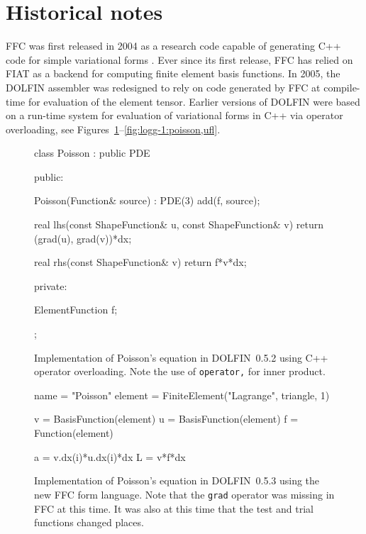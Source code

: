 \section{Historical notes}

FFC was first released in 2004 as a research code capable of
generating C++ code for simple variational forms
\citep{KirbyLogg2006,KirbyLogg2007}. Ever since its first release,
FFC has relied on FIAT as a backend for computing finite element basis
functions. In 2005, the DOLFIN assembler was redesigned to rely on
code generated by FFC at compile-time for evaluation of the element
tensor. Earlier versions of DOLFIN were based on a run-time system for
evaluation of variational forms in C++ via operator overloading, see
Figures~\ref{fig:logg-1:poisson,before}--\ref{fig:logg-1:poisson,ufl}.

\begin{figure}
  \begin{center}
\begin{c++}
class Poisson : public PDE
{
public:

  Poisson(Function& source) : PDE(3)
  {
    add(f, source);
  }

  real lhs(const ShapeFunction& u,
           const ShapeFunction& v)
  {
    return (grad(u), grad(v))*dx;
  }

  real rhs(const ShapeFunction& v)
  {
    return f*v*dx;
  }

private:

  ElementFunction f;

};
\end{c++}
  \caption{Implementation of Poisson's equation in DOLFIN~0.5.2 using C++ operator overloading.
           Note the use of \texttt{operator,} for inner product.}
  \label{fig:logg-1:poisson,before}
  \end{center}
\end{figure}

\begin{figure}
  \begin{center}
\begin{python}
name = "Poisson"
element = FiniteElement("Lagrange", triangle, 1)

v = BasisFunction(element)
u = BasisFunction(element)
f = Function(element)

a = v.dx(i)*u.dx(i)*dx
L = v*f*dx
\end{python}
\caption{Implementation of Poisson's equation in DOLFIN~0.5.3 using
  the new FFC form language. Note that the \texttt{grad} operator
  was missing in FFC at this time. It was also at this time that the
  test and trial functions changed places.}
\label{fig:logg-1:poisson,after}
  \end{center}
\end{figure}

